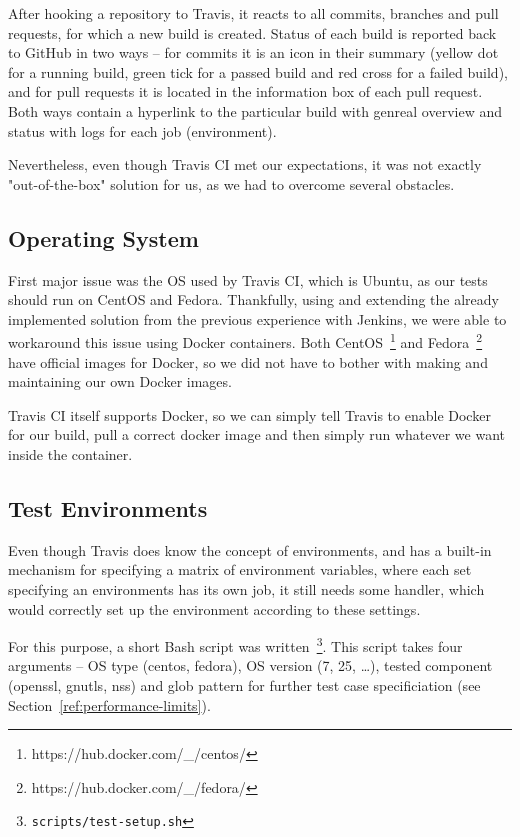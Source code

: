     After hooking a repository to Travis, it reacts to all commits, branches
    and pull requests, for which a new build is created. Status of each build
    is reported back to GitHub in two ways -- for commits it is an icon
    in their summary (yellow dot for a running build, green tick for a passed
    build and red cross for a failed build), and for pull requests it is located
    in the information box of each pull request. Both ways contain
    a hyperlink to the particular
    build with genreal overview and status with logs for each job (environment).

    Nevertheless, even though Travis CI met our expectations, it was not exactly
    "out-of-the-box" solution for us, as we had to overcome several obstacles.

\subsection{Operating System}
    First major issue was the OS used by Travis CI, which is Ubuntu, as our
    tests should run on CentOS and Fedora. Thankfully, using and extending the
    already implemented solution from the previous experience with
    Jenkins, we were able to workaround this issue using Docker containers.
    Both CentOS~\footnote{https://hub.docker.com/\_/centos/} and
    Fedora~\footnote{https://hub.docker.com/\_/fedora/} have official images
    for Docker, so we did not have to bother with making and maintaining our
    own Docker images.

    Travis CI itself supports Docker, so we can simply tell Travis to enable
    Docker for our build, pull a correct docker image and then simply run
    whatever we want inside the container.

\subsection{Test Environments}
    Even though Travis does know the concept of environments, and has a built-in
    mechanism for specifying a matrix of environment variables, where each
    set specifying an environments has its own job, it still needs some handler,
    which would correctly set up the environment according to these settings.

    For this purpose, a short Bash script was written~\footnote{\texttt{scripts/test-setup.sh}}.
    This script takes four arguments -- OS type
    (centos, fedora), OS version (7, 25, \dots), tested component (openssl, gnutls,
    nss) and glob pattern for further test case specificiation
    (see Section~\ref{ref:performance-limits}).

